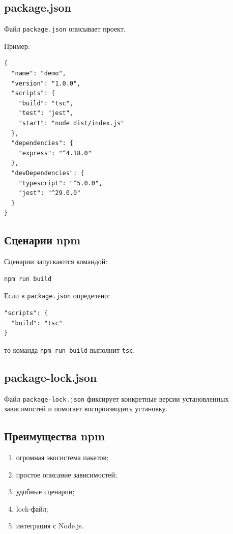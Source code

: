 \documentclass[12pt,a4paper]{article}
\begin{document}
\subsection{package.json}

Файл \texttt{package.json} описывает проект.

Пример:

\begin{lstlisting}
{
  "name": "demo",
  "version": "1.0.0",
  "scripts": {
    "build": "tsc",
    "test": "jest",
    "start": "node dist/index.js"
  },
  "dependencies": {
    "express": "^4.18.0"
  },
  "devDependencies": {
    "typescript": "^5.0.0",
    "jest": "^29.0.0"
  }
}
\end{lstlisting}

\subsection{Сценарии npm}

Сценарии запускаются командой:

\begin{lstlisting}
npm run build
\end{lstlisting}

Если в \texttt{package.json} определено:

\begin{lstlisting}
"scripts": {
  "build": "tsc"
}
\end{lstlisting}

то команда \texttt{npm run build} выполнит \texttt{tsc}.

\subsection{package-lock.json}

Файл \texttt{package-lock.json} фиксирует конкретные версии установленных зависимостей и помогает воспроизводить установку.

\subsection{Преимущества npm}

\begin{enumerate}
    \item огромная экосистема пакетов;
    \item простое описание зависимостей;
    \item удобные сценарии;
    \item lock-файл;
    \item интеграция с Node.js.
\end{enumerate}
\end{document}
